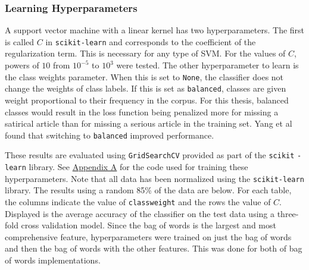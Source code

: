 \documentclass [12 pt] {report}
\begin{document}
\subsubsection*{Learning Hyperparameters}
A support vector machine with a linear kernel has two hyperparameters. The first is called $C$ in \texttt{scikit-learn} and corresponds to the coefficient of the regularization term. This is necessary for any type of SVM. For the values of $C$, powers of $10$ from $10^{-5}$ to $10^3$ were tested. The other hyperparameter to learn is the class weights parameter. When this is set to \texttt{None}, the classifier does not change the weights of class labels. If this is set as \texttt{balanced}, classes are given weight proportional to their frequency in the corpus. For this thesis, balanced classes would result in the loss function being penalized more for missing a satirical article than for missing a serious article in the training set. Yang et al \cite{Yang} found that switching to \texttt{balanced} improved performance.

These results are evaluated using \texttt{GridSearchCV} provided as part of the \texttt{scikit}
\texttt{-learn} library. See \hyperref[SVMHyperaparameters]{Appendix A} for the code used for training these hyperparameters. Note that all data has been normalized using the \texttt{scikit-learn} library. The results using a random 85\% of the data are below. For each table, the columns indicate the value of \texttt{class\textunderscore weight} and the rows the value of $C$. Displayed is the average accuracy of the classifier on the test data using a three-fold cross validation model. Since the bag of words is the largest and most comprehensive feature, hyperparameters were trained on just the bag of words and then the bag of words with the other features. This was done for both of bag of words implementations.
\end{document}
